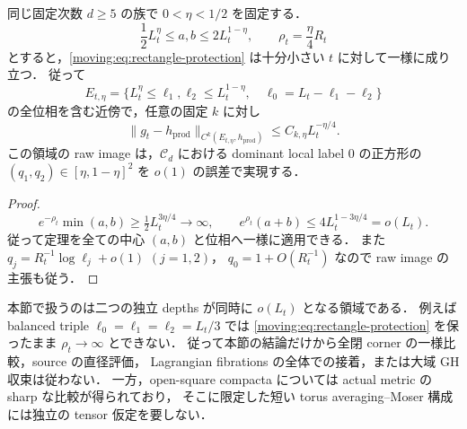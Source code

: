 \begin{corollary}
\label{coarse:cor:open-square-tensor}
同じ固定次数 $d\ge5$ の族で $0<\eta<1/2$ を固定する．
\[
 \frac12L_t^\eta\le a,b\le2L_t^{1-\eta},
 \qquad \rho_t=\frac{\eta}{4}R_t
\]
とすると，\eqref{moving:eq:rectangle-protection} は十分小さい $t$ に対して一様に成り立つ．
従って
\begin{equation}\label{moving:eq:open-square-region}
 E_{t,\eta}
 =\{L_t^\eta\le\ell_1,\ell_2\le L_t^{1-\eta},\quad
      \ell_0=L_t-\ell_1-\ell_2\}
\end{equation}
の全位相を含む近傍で，任意の固定 $k$ に対し
\begin{equation}\label{moving:eq:open-square-rate}
 \|g_t-h_{\mathrm{prod}}\|_{C^k(E_{t,\eta},h_{\mathrm{prod}})}
 \le C_{k,\eta}L_t^{-\eta/4}.
\end{equation}
この領域の raw image は，$\mathcal C_d$ における dominant local label $0$ の正方形の
$(q_1,q_2)\in[\eta,1-\eta]^2$ を $o(1)$ の誤差で実現する．
\end{corollary}

\begin{proof}
\[
 e^{-\rho_t}\min(a,b)\ge\tfrac12L_t^{3\eta/4}\longrightarrow\infty,
 \qquad
 e^{\rho_t}(a+b)\le4L_t^{1-3\eta/4}=o(L_t).
\]
従って定理を全ての中心 $(a,b)$ と位相へ一様に適用できる．
また $q_j=R_t^{-1}\log\ell_j+o(1)$ $(j=1,2)$，
$q_0=1+O(R_t^{-1})$ なので raw image の主張も従う．
\end{proof}

\begin{remark}
\label{moving:rem:scope}
本節で扱うのは二つの独立 depths が同時に $o(L_t)$ となる領域である．
例えば balanced triple $\ell_0=\ell_1=\ell_2=L_t/3$ では
\eqref{moving:eq:rectangle-protection} を保ったまま $\rho_t\to\infty$ とできない．
従って本節の結論だけから全閉 corner の一様比較，source の直径評価，
Lagrangian fibrations の全体での接着，または大域 GH 収束は従わない．
一方，open-square compacta については actual metric の sharp な比較が得られており，
そこに限定した短い torus averaging--Moser 構成には独立の tensor 仮定を要しない．
\end{remark}
